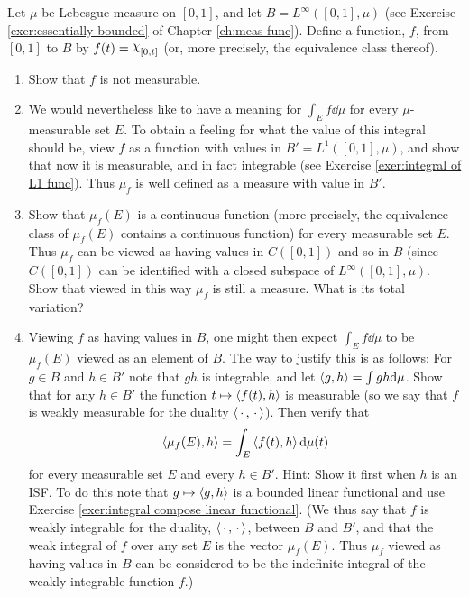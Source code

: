 \begin{enumerate}[label=\arabic*),ref=\arabic*]
Let $\mu$ be Lebesgue measure on $[0,1]$, and let $B=L^\infty([0,1],\mu)$ (see Exercise \ref{exer:essentially bounded} of Chapter \ref{ch:meas func}). Define a function, $f$, from $[0,1]$ to $B$ by $f(t)=\idf{[0,t]}$ (or, more precisely, the equivalence class thereof).

\begin{enumerate}[label=\alph*),ref=\theenumi\alph*)]
    \item Show that $f$ is not measurable.

    \item We would nevertheless like to have a meaning for $\int_Ef\dd\mu$ for every $\mu$-measurable set $E$. To obtain a feeling for what the value of this integral should be, view $f$ as a function with values in $B'=L^1([0,1],\mu)$, and show that now it is measurable, and in fact integrable (see Exercise \ref{exer:integral of L1 func}). Thus $\mu_f$ is well defined as a measure with value in $B'$.

    \item Show that $\mu_f(E)$ is a continuous function (more precisely, the equivalence class of $\mu_f(E)$ contains a continuous function) for every measurable set $E$. Thus $\mu_f$ can be viewed as having values in $C([0,1])$ and so in $B$ (since $C([0,1])$ can be identified with a closed subspace of $L^\infty([0,1],\mu)$. Show that viewed in this way $\mu_f$ is still a measure. What is its total variation?

    \item\label{exer:item:integral w duality}
    Viewing $f$ as having values in $B$, one might then expect $\int_Ef\dd\mu$ to be $\mu_f(E)$ viewed as an element of $B$. The way to justify this is as follows: For $g \in B$ and $h\in B'$ note that $gh$ is integrable, and let $\left\langle g,h\right\rangle=\int gh\dd\mu$. Show that for any $h\in B'$ the function $t\mapsto\left\langle f(t), h\right\rangle$ is measurable (so we say that $f$ is weakly measurable for the duality $\left\langle\,\cdot\,,\,\cdot\,\right\rangle$). Then verify that \[\left\langle\mu_f(E),h\right\rangle=\int_E\left\langle f(t),h\right\rangle\dd\mu(t)\] for every measurable set $E$ and every $h \in B'$. Hint: Show it first when $h$ is an ISF. To do this note that $g\mapsto\left\langle g,h\right\rangle$ is a bounded linear functional and use Exercise \ref{exer:integral compose linear functional}. (We thus say that $f$ is weakly integrable for the duality, $\left\langle\,\cdot\,,\,\cdot\,\right\rangle$, between $B$ and $B'$, and that the weak integral of $f$ over any set $E$ is the vector $\mu_f(E)$. Thus $\mu_f$ viewed as having values in $B$ can be considered to be the indefinite integral of the weakly integrable function $f$.)
    

\end{enumerate}
\end{enumerate}
